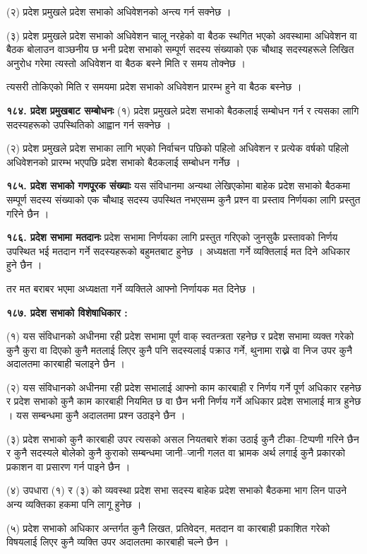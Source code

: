 (२) प्रदेश प्रमुखले प्रदेश सभाको अधिवेशनको अन्त्य गर्न सक्नेछ ।

(३) प्रदेश प्रमुखले प्रदेश सभाको अधिवेशन चालू नरहेको वा बैठक स्थगित भएको अवस्थामा अधिवेशन वा बैठक बोलाउन वाञ्छनीय छ भनी प्रदेश सभाको सम्पूर्ण सदस्य संख्याको एक चौथाइ सदस्यहरूले लिखित अनुरोध गरेमा त्यस्तो अधिवेशन वा बैठक बस्ने मिति र समय तोक्नेछ ।

त्यसरी तोकिएको मिति र समयमा प्रदेश सभाको अधिवेशन प्रारम्भ हुने वा बैठक बस्नेछ ।

\textbf{१८४. प्रदेश प्रमुखबाट सम्बोधनः} (१) प्रदेश प्रमुखले प्रदेश सभाको बैठकलाई सम्बोधन गर्न र त्यसका लागि सदस्यहरूको उपस्थितिको आह्वान गर्न सक्नेछ ।

(२) प्रदेश प्रमुखले प्रदेश सभाका लागि भएको निर्वाचन पछिको पहिलो अधिवेशन र प्रत्येक वर्षको पहिलो अधिवेशनको प्रारम्भ भएपछि प्रदेश सभाको बैठकलाई सम्बोधन गर्नेछ ।

\textbf{१८५. प्रदेश सभाको गणपूरक संख्याः} यस संविधानमा अन्यथा लेखिएकोमा बाहेक प्रदेश सभाको बैठकमा सम्पूर्ण सदस्य संख्याको एक चौथाइ सदस्य उपस्थित नभएसम्म कुनै प्रश्न वा प्रस्ताव निर्णयका लागि प्रस्तुत गरिने छैन ।

\textbf{१८६. प्रदेश सभामा मतदानः} प्रदेश सभामा निर्णयका लागि प्रस्तुत गरिएको जुनसुकै प्रस्तावको निर्णय उपस्थित भई मतदान गर्ने सदस्यहरूको बहुमतबाट हुनेछ । अध्यक्षता गर्ने व्यक्तिलाई मत दिने अधिकार हुने छैन ।

तर मत बराबर भएमा अध्यक्षता गर्ने व्यक्तिले आफ्नो निर्णायक मत दिनेछ ।

\textbf{१८७. प्रदेश सभाको विशेषाधिकार :}

(१) यस संविधानको अधीनमा रही प्रदेश सभामा पूर्ण वाक् स्वतन्त्रता रहनेछ र प्रदेश सभामा व्यक्त गरेको कुनै कुरा वा दिएको कुनै मतलाई लिएर कुनै पनि सदस्यलाई पक्राउ गर्ने, थुनामा राख्ने वा निज उपर कुनै अदालतमा कारबाही चलाइने छैन ।

(२) यस संविधानको अधीनमा रही प्रदेश सभालाई आफ्नो काम कारबाही र निर्णय गर्ने पूर्ण अधिकार रहनेछ र प्रदेश सभाको कुनै काम
कारबाही नियमित छ वा छैन भनी निर्णय गर्ने अधिकार प्रदेश सभालाई मात्र हुनेछ । यस सम्बन्धमा कुनै अदालतमा प्रश्न उठाइने छैन ।

(३) प्रदेश सभाको कुनै कारबाही उपर त्यसको असल नियतबारे शंका उठाई कुनै टीका–टिप्पणी गरिने छैन र कुनै सदस्यले बोलेको कुनै कुराको सम्बन्धमा जानी–जानी गलत वा भ्रामक अर्थ लगाई कुनै प्रकारको प्रकाशन वा प्रसारण गर्न पाइने छैन ।

(४) उपधारा (१) र (३) को व्यवस्था प्रदेश सभा सदस्य बाहेक प्रदेश सभाको बैठकमा भाग लिन पाउने अन्य व्यक्तिका हकमा पनि लागू हुनेछ ।

(५) प्रदेश सभाको अधिकार अन्तर्गत कुनै लिखत, प्रतिवेदन, मतदान वा कारबाही प्रकाशित गरेको विषयलाई लिएर कुनै व्यक्ति उपर अदालतमा कारबाही चल्ने छैन ।


